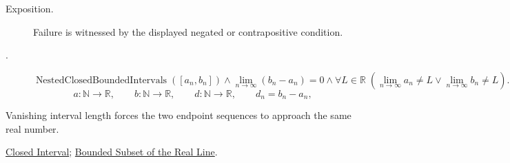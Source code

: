 \begin{remark*}
\begin{description}
  \item[Exposition.]
  Failure is witnessed by the displayed negated or contrapositive condition.

  \item[.]
  \[
\operatorname{NestedClosedBoundedIntervals}([a_n,b_n])
\land
\lim_{n\longrightarrow\infty}(b_n-a_n)=0
\land
\forall L\in\mathbb{R}\;
\left(\lim_{n\longrightarrow\infty}a_n\ne L\lor \lim_{n\longrightarrow\infty}b_n\ne L\right).
\]
\[
a\colon\mathbb{N}\longrightarrow\mathbb{R},\qquad b\colon\mathbb{N}\longrightarrow\mathbb{R},\qquad
d\colon\mathbb{N}\longrightarrow\mathbb{R},\qquad d_n=b_n-a_n,
\]
\end{description}
\end{remark*}

\begin{remark*}[Interpretation]
Vanishing interval length forces the two endpoint sequences to approach the
same real number.
\end{remark*}

\begin{dependencies}
\hyperref[def:closed-interval]{Closed Interval};
\hyperref[def:bounded-subset-of-r]{Bounded Subset of the Real Line}.
\end{dependencies}

